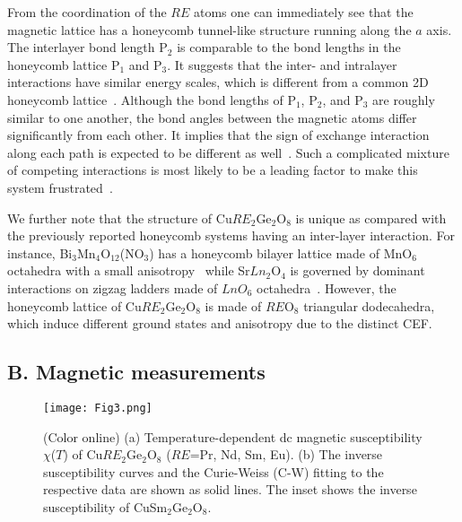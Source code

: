 \documentclass[aps,prl,reprint,amsmath,amssymb,superscriptaddress,showpacs]{revtex4-1}
\begin{document}
From the coordination of the $RE$ atoms one can immediately see that the magnetic lattice has a honeycomb tunnel-like structure running along the $a$ axis. The interlayer bond length P$_2$ is comparable to the bond lengths in the honeycomb lattice P$_1$ and P$_3$. It suggests that the inter- and intralayer interactions have similar energy scales, which is different from a common 2D honeycomb lattice~\cite{T.Sato2003}. Although the bond lengths of P$_1$, P$_2$, and P$_3$ are roughly similar to one another, the bond angles between the magnetic atoms differ significantly from each other. It implies that the sign of exchange interaction along each path is expected to be different as well~\cite{J.Goodenough1963}. Such a complicated mixture of competing interactions is most likely to be a leading factor to make this system frustrated~\cite{C.Balz2016,S.Derakhshan2008,D.Peets2017,R.Nirmala2017}.

We further note that the structure of Cu$RE_2$Ge$_2$O$_8$ is unique as compared with the previously reported honeycomb systems having an inter-layer interaction. For instance, Bi$_3$Mn$_4$O$_{12}$(NO$_3$) has a honeycomb bilayer lattice made of MnO$_6$ octahedra with a small anisotropy~\cite{O.Smirnova2009,H.Kandpal2011} while Sr$Ln_2$O$_4$ is governed by dominant interactions on zigzag ladders made of $Ln$$O_6$ octahedra~\cite{H.Karunadasa2005,J.Wen2015}. However, the honeycomb lattice of Cu$RE_2$Ge$_2$O$_8$ is made of $RE$O$_8$ triangular dodecahedra, which induce different ground states and anisotropy due to the distinct CEF.

\subsection{B. Magnetic measurements}

\begin{figure}[t]
\texttt{[image: Fig3.png]}
\caption{\label{fig3}(Color online) (a) Temperature-dependent dc magnetic susceptibility $\chi$($T$) of Cu$RE_2$Ge$_2$O$_8$ ($RE$=Pr, Nd, Sm, Eu). (b) The inverse susceptibility curves and the Curie-Weiss (C-W) fitting to the respective data are shown as solid lines. The inset shows the inverse susceptibility of CuSm$_2$Ge$_2$O$_8$.}
\end{figure}
\end{document}
